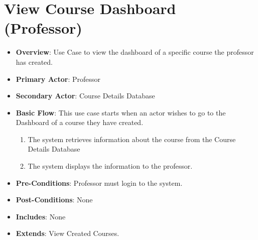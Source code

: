 \documentclass[12pt, a4]{report}
\begin{document}
\section{View Course Dashboard (Professor)}
\begin{itemize}
    \item \textbf{Overview}: Use Case to view the dashboard of a specific course the professor has created.
    \item \textbf{Primary Actor}: Professor
    \item \textbf{Secondary Actor}: Course Details Database
    \item \textbf{Basic Flow}: This use case starts when an actor wishes to go to the Dashboard of a course they have created.
        \begin{enumerate}
            \item The system retrieves information about the course from the Course Details Database
            \item The system displays the information to the professor.
        \end{enumerate}
    \item \textbf{Pre-Conditions}: Professor must login to the system.
    \item \textbf{Post-Conditions}: None
    \item \textbf{Includes}: None
    \item \textbf{Extends}: View Created Courses.
\end{itemize}

\end{document}
